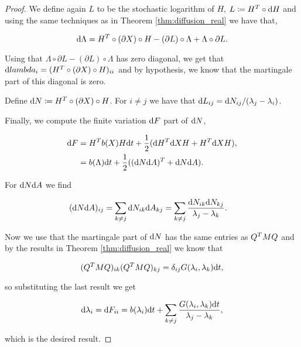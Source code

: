 \begin{proof}
    We define again $L$ to be the stochastic logarithm of $H$, $L \coloneqq H^T \circ \mathrm d H$ and using the same techniques as in Theorem \ref{thm:diffusion_real} we have that,

    \begin{equation*}
        \mathrm d \Lambda = H^T \circ(\partial X) \circ H - (\partial L)\circ \Lambda + \Lambda \circ \partial L.
    \end{equation*}

    Using that $\Lambda \circ \partial L -  (\partial L)\circ \Lambda $ has zero diagonal, we get that $\mathrm d lambda_i = (H^T \circ(\partial X) \circ H)_{ii}$ and by hypothesis, we know that the martingale part of this diagonal is zero. 

    Define $\mathrm d N \coloneqq H^T \circ(\partial X) \circ H$. For $i\neq j$ we have that $\mathrm d L_{ij} = \mathrm d N_{ij}/(\lambda_j - \lambda_i)$.

    Finally, we compute the finite variation $\mathrm d F$ part of $\mathrm d N$,

    \begin{align*}
        \mathrm d F &= H^T b(X) H \mathrm d t + \frac12 (\mathrm d H^T \mathrm d X H + H^T \mathrm d X H), \\ 
        &= b(\Lambda) \mathrm d t + \frac12( (\mathrm d N\mathrm d A)^T + \mathrm d N \mathrm d A ).
    \end{align*}

    For $\mathrm d N \mathrm d A$ we find

    \begin{align*}
        (\mathrm d N \mathrm d A)_{ij} &= \sum_{k\neq j} \mathrm d N_{ik}\mathrm d A_{kj} = \sum_{k\neq j} \frac{\mathrm d N_{ik}\mathrm d N_{kj}}{\lambda_j - \lambda_k}.
    \end{align*}

    Now we use that the martingale part of  $\mathrm d N$ has the same entries as $Q^T M Q$ and by the results in Theorem \ref{thm:diffusion_real} we know that 

    \begin{equation*}
        (Q^T M Q)_{ik}(Q^T M Q)_{kj} = \delta_{ij}G(\lambda_i,\lambda_k)\mathrm d t,
    \end{equation*}

    \noindent so substituting the last result we get

    \begin{equation*}
        \mathrm d \lambda_i = \mathrm d F_{ii} = b(\lambda_i)\mathrm d t + \sum_{k\neq j} \frac{G(\lambda_i,\lambda_k)\mathrm d t}{\lambda_j - \lambda_k},
    \end{equation*}

    \noindent which is the desired result.



\end{proof}


